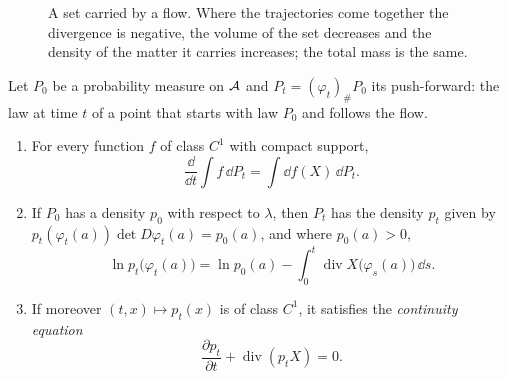 \begin{notechapter}
\begin{figure}[ht]
\centering
{}
\caption{A set carried by a flow. Where the trajectories come
together the divergence is negative, the volume of the set decreases
and the density of the matter it carries increases; the total mass is
the same.}
\label{odes-flows:fig:flow}
\end{figure}

\begin{theorem}
\label{odes-flows:thm:transport}
Let $P_0$ be a probability measure on $\mathcal{A}$ and
$P_t = (\varphi_t)_\#P_0$ its push-forward: the law at time $t$ of a
point that starts with law $P_0$ and follows the flow.
\begin{enumerate}[nosep]
  \item For every function $f$ of class $C^1$ with compact support,
        \[
          \frac{\dd}{\dd t}\int f\,\dd P_t = \int\dd f(X)\,\dd P_t .
        \]
  \item If $P_0$ has a density $p_0$ with respect to $\lambda$, then
        $P_t$ has the density $p_t$ given by
        $p_t(\varphi_t(a))\det D\varphi_t(a) = p_0(a)$, and where
        $p_0(a) > 0$,
        \[
          \ln p_t\bigl(\varphi_t(a)\bigr)
          = \ln p_0(a)
          - \int_0^t\operatorname{div}X\bigl(\varphi_s(a)\bigr)\,
          \dd s .
        \]
  \item If moreover $(t, x)\mapsto p_t(x)$ is of class $C^1$, it
        satisfies the \emph{continuity equation}
        \[
          \frac{\partial p_t}{\partial t}
          + \operatorname{div}(p_tX) = 0 .
        \]
\end{enumerate}
\end{theorem}


\end{notechapter}
